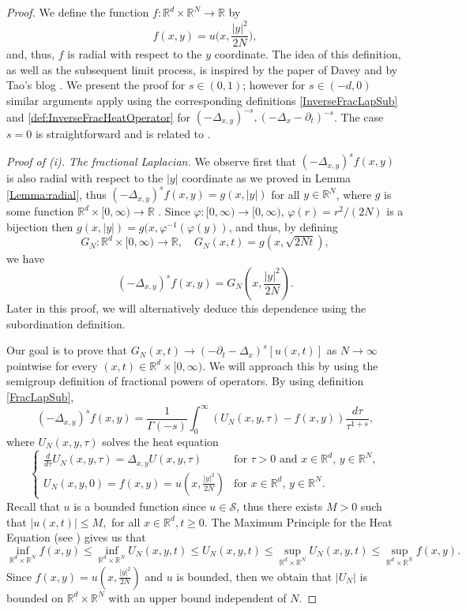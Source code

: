 \documentclass[11pt, twoside, notitlepage]{amsart}
\newcommand\R{\mathbb{R}}
\newcommand\RN{\mathbb{R}^N}
\numberwithin{equation}{section}
\begin{document}
\begin{proof}%
We define the function  $f:\R^d \times \RN \to \R$  by
$$f(x,y)=u\big(x,\frac{|y|^2}{2N}\big) ,$$
and, thus,  $f$ is radial with respect to the $y$ coordinate.
The idea of this definition, as well as the subsequent limit process, is inspired by the paper of Davey \cite{DaveyARMA2018} and by Tao's blog \cite{Tao}. We present the proof for $s\in (0,1)$; however for $s\in (-d,0)$ similar arguments apply using the corresponding definitions \eqref{InverseFracLapSub} and \eqref{def:InverseFracHeatOperator} for $(-\Delta_{x,y})^{-s}, ( -\Delta_x-\partial_t)^{-s}$.  The case $s=0$ is straightforward and is related to \cite{DaveyARMA2018}.

\noindent\emph{Proof of (i). The fractional Laplacian. }
We observe first that $(-\Delta_{x,y})^s f(x,y)$ is also radial with respect to the $|y|$ coordinate as we proved in Lemma \ref{Lemma:radial}, thus $(-\Delta_{x,y})^s f(x,y)=g(x,|y|)$ for all $y\in \R^N$, where $g$ is some function $\R^d \times [0,\infty)\to \R$ . Since $\varphi:[0,\infty) \to [0,\infty)$,  $\varphi(r)=r^2/(2N)$ is a bijection then $g(x,|y|)=
g(x,\varphi^{-1}(\varphi(y))$, and thus,
by defining
$$G_N:\R^d \times [0,\infty)\to \R,\quad G_N(x,t)=g(x,\sqrt{2N t}),$$
we have
\begin{equation}\label{FractLap:f}
(-\Delta_{x,y})^s f(x,y) =   G_N(x,  \frac{|y|^2}{2N}).
\end{equation}
Later in this proof, we will alternatively deduce this dependence  using the subordination definition.

Our goal is to prove that $G_N(x, t) \rightarrow (-\partial_t-\Delta_x)^s [u(x,t)]$ as $N\to \infty$ pointwise for every $(x,t) \in \R^d\times [0,\infty).$  We will approach this by using the semigroup definition of fractional powers of operators.
  By using definition \eqref{FracLapSub},
$$
(-\Delta_{x,y})^s f(x,y)=\frac{1}{\Gamma(-s)} \int_0^ \infty ( U_N(x,y,\tau) - f(x,y)) \frac{d\tau}{\tau^ {1+s}},
$$
where $U_N(x,y,\tau)$ solves the heat equation
\begin{equation} \label{eq:U}
  \left\{ \begin{array}{ll}
  \frac{d}{d\tau} U_N(x,y,\tau)=\Delta_{x,y} U(x,y,\tau) &\text{for }\tau>0 \text{ and } x \in \R^d, \, y \in \R^N, \\[2mm]
  U_N(x,y,0)  =f(x,y)=u(x, \frac{|y|^2}{2N} ) &\text{for } x \in \R^d, \, y \in \RN.
    \end{array}
    \right.
\end{equation}
 Recall that  $u$ is a bounded function since $u\in \mathcal{S}$, thus there exists $M>0$ such that $|u(x,t)| \le M,$ for all $  x\in \R^d, t\ge0.$  The Maximum Principle for the Heat Equation  (see \cite[p.57]{Evans}) %
gives us that
$$ \inf_{\R^d \times  \R^N} f(x,y)  \le \inf_{\R^d \times  \R^N}  U_N(x,y,t) \le  U_N(x,y,t)\le \sup_{\R^d \times  \R^N} U_N(x,y,t) \le \sup_{\R^d \times  \R^N} f(x,y).$$
Since $f(x,y)=u(x, \frac{|y|^2}{2N} )$ and $u$ is bounded, then we obtain that  $|U_N|$ is bounded on $\R^d \times \R^N$ with an upper bound independent of $N$.  \normalcolor


\end{proof}
\end{document}
